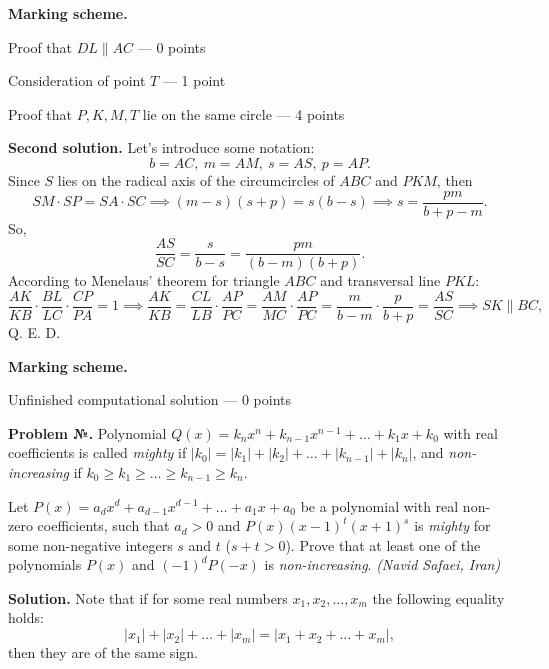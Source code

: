 \documentclass[12pt]{article}
\newcounter{problem}
\newcommand{\z}{\par  \smallskip \noindent \refstepcounter{problem}%
\textbf{Problem №\arabic{problem}.} }
\def\sol{\par \bigskip \noindent \textbf{Solution. }}
\def\solII{\par \noindent \textbf{Second solution. }}
\begin{document}
\bigskip

\textbf{Marking scheme.}
\begin{compactitem}
\item Proof that $DL \parallel AC$ --- 0 points
\item Consideration of point $T$ --- 1 point
\item Proof that $P, K, M, T$ lie on the same circle --- 4 points
\end{compactitem}

\bigskip

\solII Let's introduce some notation:
\[b = AC, \ m = AM, \ s = AS, \ p = AP.\]
Since $S$ lies on the radical axis of the circumcircles of $ABC$ and $PKM$, then
\[SM \cdot SP = SA \cdot SC \implies (m - s)(s + p) = s(b - s) \implies s = \frac{pm}{b + p - m}.\]
So,
\[\frac{AS}{SC} = \frac{s}{b - s} = \frac{pm}{(b - m)(b + p)}.\]
According to Menelaus' theorem for triangle $ABC$ and transversal line $PKL$:
\[\frac{AK}{KB} \cdot \frac{BL}{LC} \cdot \frac{CP}{PA} = 1 \implies \frac{AK}{KB} = \frac{CL}{LB} \cdot \frac{AP}{PC} = \frac{AM}{MC} \cdot \frac{AP}{PC} = \frac{m}{b - m} \cdot \frac{p}{b + p} = \frac{AS}{SC} \implies SK \parallel BC,\]
Q. E. D.

\bigskip

\textbf{Marking scheme.}
\begin{compactitem}
\item Unfinished computational solution --- 0 points
\end{compactitem}

\bigskip

\z Polynomial $Q(x) = k_n x^n + k_{n-1} x^{n-1} + \ldots + k_1 x + k_0$ with real coefficients is called \textit{mighty} if $|k_0| = |k_1| + |k_2| + \ldots + |k_{n-1}| + |k_n|$, and \textit{non-increasing} if $k_0 \geq k_1 \geq \ldots \geq k_{n-1} \geq k_n$. 

Let $P(x) = a_d x^d + a_{d-1} x^{d-1} + \ldots + a_1 x + a_0$ be a polynomial with real non-zero coefficients, such that $a_d > 0$ and $P(x)(x-1)^t(x+1)^s$ is \textit{mighty} for some non-negative integers $s$ and $t$ ($s + t > 0$). Prove that at least one of the polynomials $P(x)$ and $(-1)^d P(-x)$ is \textit{non-increasing}. \textit{(Navid Safaei, Iran)}

\bigskip

\sol Note that if for some real numbers $x_1, x_2, \ldots, x_m$ the following equality holds:
\[|x_1| + |x_2| + \ldots + |x_m| = |x_1 + x_2 + \ldots + x_m|,\]
then they are of the same sign.
\end{document}
